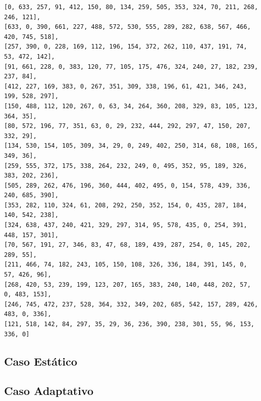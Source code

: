 \begin{lstlisting}[float, floatplacement=H, caption={Mapa de cidades para o problema do Caixeiro Viajante Adaptado.}, label=lst:cidades]
[0, 633, 257, 91, 412, 150, 80, 134, 259, 505, 353, 324, 70, 211, 268, 246, 121],
[633, 0, 390, 661, 227, 488, 572, 530, 555, 289, 282, 638, 567, 466, 420, 745, 518],
[257, 390, 0, 228, 169, 112, 196, 154, 372, 262, 110, 437, 191, 74, 53, 472, 142],
[91, 661, 228, 0, 383, 120, 77, 105, 175, 476, 324, 240, 27, 182, 239, 237, 84],
[412, 227, 169, 383, 0, 267, 351, 309, 338, 196, 61, 421, 346, 243, 199, 528, 297],
[150, 488, 112, 120, 267, 0, 63, 34, 264, 360, 208, 329, 83, 105, 123, 364, 35],
[80, 572, 196, 77, 351, 63, 0, 29, 232, 444, 292, 297, 47, 150, 207, 332, 29],
[134, 530, 154, 105, 309, 34, 29, 0, 249, 402, 250, 314, 68, 108, 165, 349, 36],
[259, 555, 372, 175, 338, 264, 232, 249, 0, 495, 352, 95, 189, 326, 383, 202, 236],
[505, 289, 262, 476, 196, 360, 444, 402, 495, 0, 154, 578, 439, 336, 240, 685, 390],
[353, 282, 110, 324, 61, 208, 292, 250, 352, 154, 0, 435, 287, 184, 140, 542, 238],
[324, 638, 437, 240, 421, 329, 297, 314, 95, 578, 435, 0, 254, 391, 448, 157, 301],
[70, 567, 191, 27, 346, 83, 47, 68, 189, 439, 287, 254, 0, 145, 202, 289, 55],
[211, 466, 74, 182, 243, 105, 150, 108, 326, 336, 184, 391, 145, 0, 57, 426, 96],
[268, 420, 53, 239, 199, 123, 207, 165, 383, 240, 140, 448, 202, 57, 0, 483, 153],
[246, 745, 472, 237, 528, 364, 332, 349, 202, 685, 542, 157, 289, 426, 483, 0, 336],
[121, 518, 142, 84, 297, 35, 29, 36, 236, 390, 238, 301, 55, 96, 153, 336, 0]
\end{lstlisting}

\subsection{Caso Estático}

\subsection{Caso Adaptativo}

